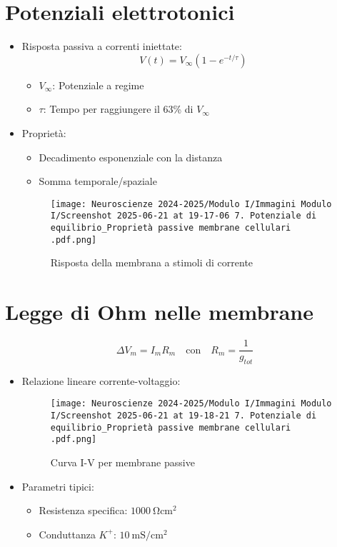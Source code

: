 \documentclass{article}
\begin{document}
\section{Potenziali elettrotonici}
\begin{itemize}
\item Risposta passiva a correnti iniettate:
\[
V(t) = V_{\infty} \left(1 - e^{-t/\tau}\right)
\]
\begin{itemize}
\item \(V_{\infty}\): Potenziale a regime
\item \(\tau\): Tempo per raggiungere il 63\% di \(V_{\infty}\)
\end{itemize}

\item Proprietà:
\begin{itemize}
\item Decadimento esponenziale con la distanza
\item Somma temporale/spaziale
\end{itemize}

\begin{figure}[h]
\centering
\texttt{[image: Neuroscienze 2024-2025/Modulo I/Immagini Modulo I/Screenshot 2025-06-21 at 19-17-06 7. Potenziale di equilibrio\_Proprietà passive membrane cellulari .pdf.png]}
\caption{Risposta della membrana a stimoli di corrente}
\label{fig:elettrotonico}
\end{figure}
\end{itemize}

\section{Legge di Ohm nelle membrane}
\[
\Delta V_m = I_m R_m \quad \text{con} \quad R_m = \frac{1}{g_{tot}}
\]
\begin{itemize}
\item Relazione lineare corrente-voltaggio:
\begin{figure}[h]
\centering
\texttt{[image: Neuroscienze 2024-2025/Modulo I/Immagini Modulo I/Screenshot 2025-06-21 at 19-18-21 7. Potenziale di equilibrio\_Proprietà passive membrane cellulari .pdf.png]}
\caption{Curva I-V per membrane passive}
\label{fig:ohm}
\end{figure}

\item Parametri tipici:
\begin{itemize}
\item Resistenza specifica: \(\SI{1000}{\ohm\centi\meter\squared}\)
\item Conduttanza \(K^+\): \(\SI{10}{\milli\siemens\per\centi\meter\squared}\)
\end{itemize}
\end{itemize}
\end{document}
